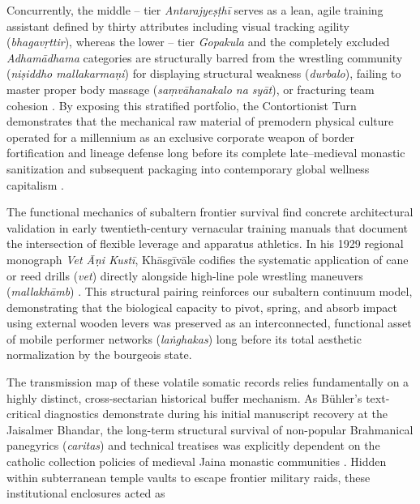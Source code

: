 \documentclass[11pt,twoside,letterpaper]{article}
\begin{document}
Concurrently, the middle -- tier \textit{Antarajyeṣṭhī} serves as a lean, agile training assistant defined by thirty attributes including visual tracking agility (\textit{bhagavṛttir}), whereas the lower -- tier \textit{Gopakula} and the completely excluded \textit{Adhamādhama} categories are structurally barred from the wrestling community (\textit{niṣiddho mallakarmaṇi}) for displaying structural weakness (\textit{durbalo}), failing to master proper body massage (\textit{saṃvāhanakalo na syāt}), or fracturing team cohesion \citep{Sandesara1964}. By exposing this stratified portfolio, the Contortionist Turn demonstrates that the mechanical raw material of premodern physical culture operated for a millennium as an exclusive corporate weapon of border fortification and lineage defense long before its complete late--medieval monastic sanitization and subsequent packaging into contemporary global wellness capitalism \citep{Sandesara1964, Wujastyk2025}.

The functional mechanics of subaltern frontier survival find concrete architectural validation in early twentieth-century vernacular training manuals that document the intersection of flexible leverage and apparatus athletics. In his 1929 regional monograph \textit{Vet Āṇi Kustī}, Khāsgīvāle codifies the systematic application of cane or reed drills (\textit{vet}) directly alongside high-line pole wrestling maneuvers (\textit{mallakhāmb}) \citep{Khasgivale1929}. This structural pairing reinforces our subaltern continuum model, demonstrating that the biological capacity to pivot, spring, and absorb impact using external wooden levers was preserved as an interconnected, functional asset of mobile performer networks (\textit{laṅghakas}) long before its total aesthetic normalization by the bourgeois state.

The transmission map of these volatile somatic records relies fundamentally on a highly distinct, cross-sectarian historical buffer mechanism. As Bühler’s text-critical diagnostics demonstrate during his initial manuscript recovery at the Jaisalmer Bhandar, the long-term structural survival of non-popular Brahmanical panegyrics (\textit{caritas}) and technical treatises was explicitly dependent on the catholic collection policies of medieval Jaina monastic communities \citep{Buhler1875}. Hidden within subterranean temple vaults to escape frontier military raids, these institutional enclosures acted as
\end{document}

